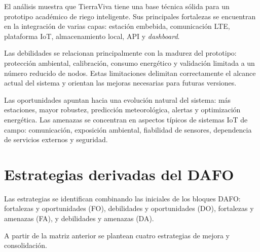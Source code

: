 El análisis muestra que TierraViva tiene una base técnica sólida para un prototipo académico de riego inteligente. Sus principales fortalezas se encuentran en la integración de varias capas: estación embebida, comunicación LTE, plataforma IoT, almacenamiento local, API y \textit{dashboard}.

Las debilidades se relacionan principalmente con la madurez del prototipo: protección ambiental, calibración, consumo energético y validación limitada a un número reducido de nodos. Estas limitaciones delimitan correctamente el alcance actual del sistema y orientan las mejoras necesarias para futuras versiones.

Las oportunidades apuntan hacia una evolución natural del sistema: más estaciones, mayor robustez, predicción meteorológica, alertas y optimización energética. Las amenazas se concentran en aspectos típicos de sistemas IoT de campo: comunicación, exposición ambiental, fiabilidad de sensores, dependencia de servicios externos y seguridad.

\section{Estrategias derivadas del DAFO}

Las estrategias se identifican combinando las iniciales de los bloques DAFO: fortalezas y oportunidades (FO), debilidades y oportunidades (DO), fortalezas y amenazas (FA), y debilidades y amenazas (DA).

A partir de la matriz anterior se plantean cuatro estrategias de mejora y consolidación.

\begingroup
\small
\renewcommand{\arraystretch}{1.18}

